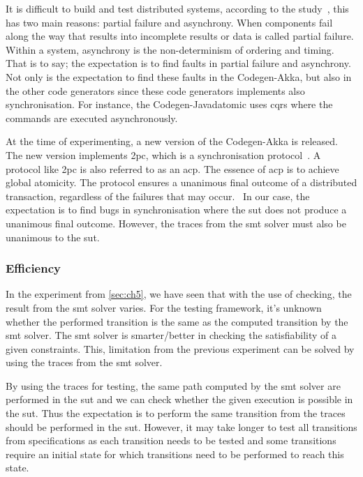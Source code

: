 It is difficult to build and test distributed systems, according to the
study~\cite[p.~1]{mccaffrey2016verification}, this has two main reasons: partial
failure and asynchrony. When components fail along the way that results into
incomplete results or data is called partial failure. Within a system,
asynchrony is the non-determinism of ordering and timing. That is to say; the
expectation is to find faults in partial failure and asynchrony. Not only is the
expectation to find these faults in the Codegen-Akka, but also in the other code
generators since these code generators implements also synchronisation. For
instance, the Codegen-Javadatomic uses \gls{cqrs} where the commands are
executed asynchronously.

At the time of experimenting, a new version of the Codegen-Akka is
released. The new version implements \gls{2pc}, which is a synchronisation
protocol~\cite[p.~3204]{al2009two}. A protocol like \gls{2pc} is also referred
to as an \gls{acp}. The essence of \gls{acp} is to achieve global atomicity. The
protocol ensures a unanimous final outcome of a distributed transaction,
regardless of the failures that may occur.~\cite[p.~3204]{al2009two} In our
case, the expectation is to find bugs in synchronisation where the \gls{sut}
does not produce a unanimous final outcome. However, the traces from the
\gls{smt} solver must also be unanimous to the \gls{sut}.

\subsubsection{Efficiency}
In the experiment from \autoref{sec:ch5}, we have seen that with the use of
checking, the result from the \gls{smt} solver varies. For the testing
framework, it's unknown whether the performed transition is the same as the
computed transition by the \gls{smt} solver. The \gls{smt} solver is
smarter/better in checking the satisfiability of a given constraints. This,
limitation from the previous experiment can be solved by using the traces from
the \gls{smt} solver.

By using the traces for testing, the same path computed by the \gls{smt} solver
are performed in the \gls{sut} and we can check whether the given
execution is possible in the \gls{sut}. Thus the expectation is to perform the
same transition from the traces should be performed in the \gls{sut}.
However, it may take longer to test all transitions from specifications as each
transition needs to be tested and some transitions require an initial state for
which transitions need to be performed to reach this state.

